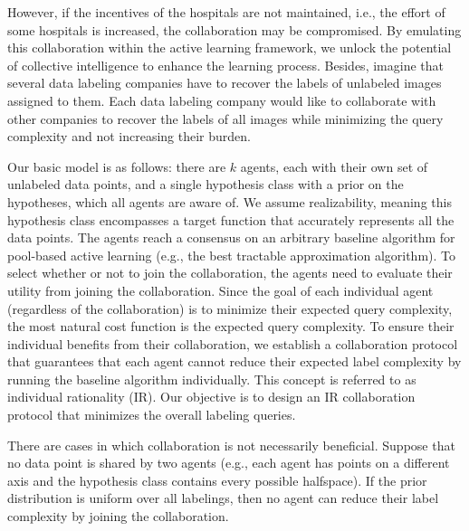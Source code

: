 However, if the incentives of the hospitals are not maintained, i.e., the effort of some hospitals is increased, the collaboration may be compromised. By emulating this collaboration within the active learning framework, we unlock the potential of collective intelligence to enhance the learning process. 
Besides, imagine that several data labeling companies have to recover the labels of unlabeled images assigned to them. Each data labeling company would like to collaborate with other companies to recover the labels of all images while minimizing the query complexity and not increasing their burden.
%






Our basic model is as follows: there are $k$ agents, each with their own set of unlabeled data points, and a single hypothesis class with a prior on the hypotheses, which all agents are aware of.
We assume realizability, meaning this hypothesis class encompasses a target function that accurately represents all the data points. 
The agents reach a consensus on an arbitrary baseline algorithm for pool-based active learning (e.g., the best tractable approximation algorithm).
To select whether or not to join the collaboration, the agents need to evaluate their utility from joining the collaboration. Since the goal of each individual agent (regardless of the collaboration) is to minimize their expected query complexity, the most natural cost function is the expected query complexity.
To ensure their individual benefits from their collaboration, we establish a collaboration protocol that guarantees that each agent cannot reduce their expected label complexity by running the baseline algorithm individually. This concept is referred to as individual rationality (IR). Our objective is to design an IR collaboration protocol that minimizes the overall labeling queries.





There are cases in which collaboration is not necessarily beneficial. Suppose that no data point is shared by two agents (e.g., each agent has points on a different axis and the hypothesis class contains every possible halfspace). If the prior distribution is uniform over all labelings, then no agent can reduce their label complexity by joining the collaboration.

